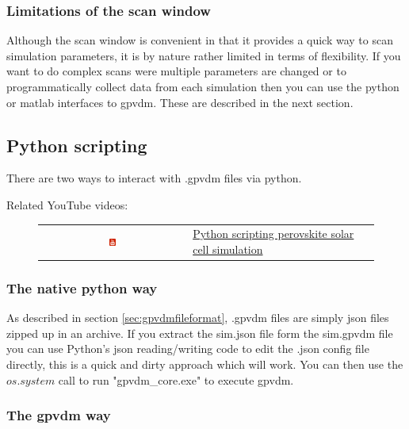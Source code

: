 \subsubsection{Limitations of the scan window}
Although the scan window is convenient in that it provides a quick way to scan simulation parameters, it is by nature rather limited in terms of flexibility. If you want to do complex scans were multiple parameters are changed or to programmatically collect data from each simulation then you can use the python or matlab interfaces to gpvdm.  These are described in the next section.

\newpage
\subsection{Python scripting}
There are two ways to interact with .gpvdm files via python.

Related YouTube videos:
\begin{figure}[H]

\begin{tabular}{ c l }

\includegraphics[width=0.05\textwidth]{./images/youtube.png}

&
\href{https://www.youtube.com/watch?v=vyeAzxBZjMg}{Python scripting perovskite solar cell simulation}

\end{tabular}
\end{figure}


\subsubsection{The native python way}
As described in section \ref{sec:gpvdmfileformat}, .gpvdm files are simply json files zipped up in an archive. If you extract the sim.json file form the sim.gpvdm file you can use Python's json reading/writing code to edit the .json config file directly, this is a quick and dirty approach which will work. You can then use the $os.system$ call to run "gpvdm\_core.exe" to execute gpvdm.
\subsubsection{The gpvdm way}

\label{sec:pythonscripts}


